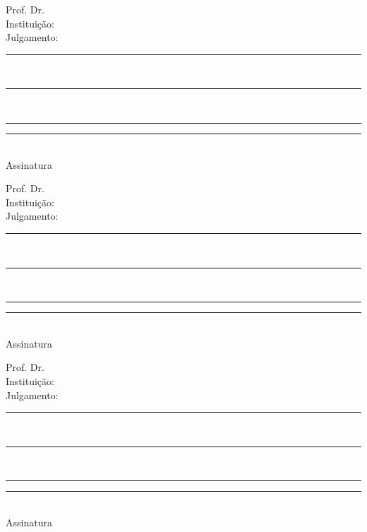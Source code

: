 \documentclass[normalnum]{politex}
\begin{document}
\begin{folhadeaprovacao}
  \vspace{1cm}
  {\noindent}\begin{minipage}{.16\textwidth}%
    Prof. Dr.\\
    Instituição:\\
    Julgamento:
  \end{minipage}%
  {\noindent}\begin{minipage}{.40\textwidth}%
    \hfil\rule[-0.9em]{\textwidth}{.4pt}\\
    \hfil\rule[-0.9em]{\textwidth}{.4pt}\\
    \hfil\rule[-0.9em]{\textwidth}{.4pt}
  \end{minipage}%
  \hfil{\noindent}\begin{minipage}{.30\textwidth}%
    \centering\vspace{1cm}\rule{5cm}{.8pt}\\%
    {\nopagebreak}Assinatura\par
  \end{minipage}

  \vspace{1cm}
  {\noindent}\begin{minipage}{.16\textwidth}%
    Prof. Dr.\\
    Instituição:\\
    Julgamento:
  \end{minipage}%
  {\noindent}\begin{minipage}{.40\textwidth}%
    \hfil\rule[-0.9em]{\textwidth}{.4pt}\\
    \hfil\rule[-0.9em]{\textwidth}{.4pt}\\
    \hfil\rule[-0.9em]{\textwidth}{.4pt}
  \end{minipage}%
  \hfil{\noindent}\begin{minipage}{.30\textwidth}%
    \centering\vspace{1cm}\rule{5cm}{.8pt}\\%
    {\nopagebreak}Assinatura\par
  \end{minipage}

  \vspace{1cm}
  {\noindent}\begin{minipage}{.16\textwidth}%
    Prof. Dr.\\
    Instituição:\\
    Julgamento:
  \end{minipage}%
  {\noindent}\begin{minipage}{.40\textwidth}%
    \hfil\rule[-0.9em]{\textwidth}{.4pt}\\
    \hfil\rule[-0.9em]{\textwidth}{.4pt}\\
    \hfil\rule[-0.9em]{\textwidth}{.4pt}
  \end{minipage}%
  \hfil{\noindent}\begin{minipage}{.30\textwidth}%
    \centering\vspace{1cm}\rule{5cm}{.8pt}\\%
    {\nopagebreak}Assinatura\par
  \end{minipage}%
\end{folhadeaprovacao}
\end{document}
